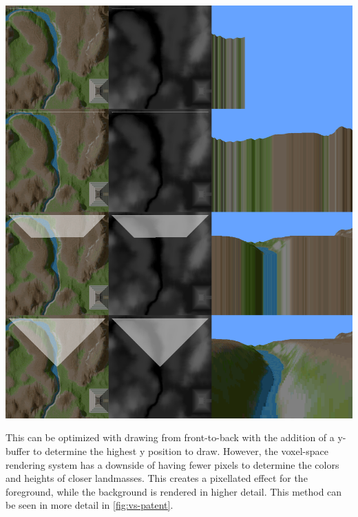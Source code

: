 \documentclass[10pt]{report}
\begin{document}
		\begin{minipage}{\textwidth}
			\centering
			\includegraphics[scale=.2]{line-by-line}
			\label{fig:vs-raster}
		\end{minipage}
	
		This can be optimized with drawing from front-to-back with the addition of a y-buffer to determine the highest y position to draw. However, the voxel-space rendering system has a downside of having fewer pixels to determine the colors and heights of closer landmasses. This creates a pixellated effect for the foreground, while the background is rendered in higher detail. This method can be seen in more detail in \autoref{fig:vs-patent}. 
		 
\end{document}
